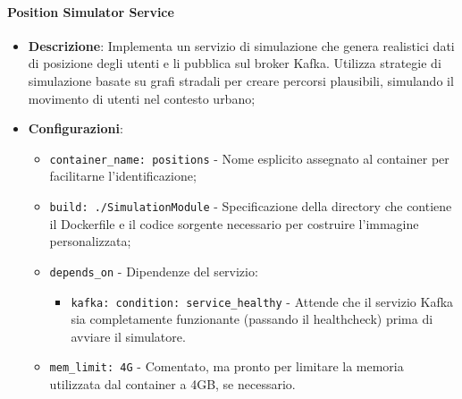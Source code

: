 \documentclass[10pt]{article}
\begin{document}
        \paragraph{Position Simulator Service}
        \begin{itemize} 
        \item \textbf{Descrizione}: Implementa un servizio di simulazione che genera realistici dati di posizione degli utenti e li pubblica sul broker Kafka. Utilizza strategie di simulazione basate su grafi stradali per creare percorsi plausibili, simulando il movimento di utenti nel contesto urbano;
        \item \textbf{Configurazioni}:
        \begin{itemize}
            \item \texttt{container\_name: positions} - Nome esplicito assegnato al container per facilitarne l'identificazione;
            \item \texttt{build: ./SimulationModule} - Specificazione della directory che contiene il Dockerfile e il codice sorgente necessario per costruire l'immagine personalizzata;
            \item \texttt{depends\_on} - Dipendenze del servizio:
            \begin{itemize}
                \item \texttt{kafka: condition: service\_healthy} - Attende che il servizio Kafka sia completamente funzionante (passando il healthcheck) prima di avviare il simulatore.
            \end{itemize}
            \item \texttt{mem\_limit: 4G} - Comentato, ma pronto per limitare la memoria utilizzata dal container a 4GB, se necessario.
        \end{itemize}
        

\end{itemize}
\end{document}
